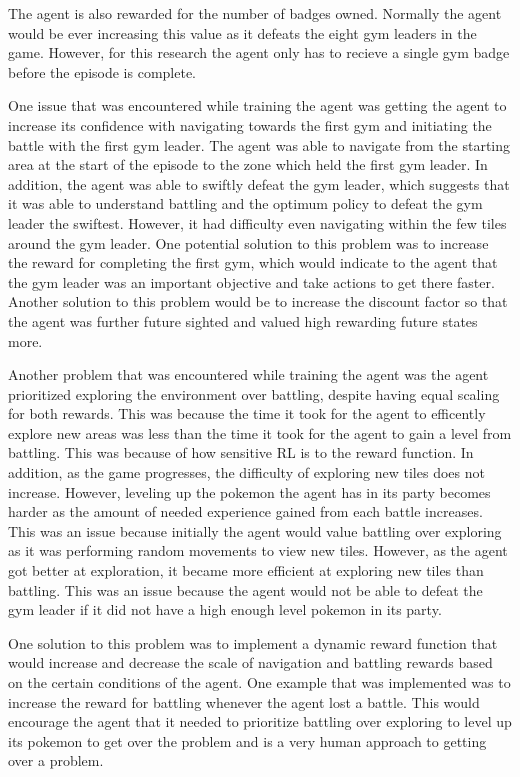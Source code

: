 The agent is also rewarded for the number of badges owned. Normally the agent would be ever increasing this value as it defeats the eight gym leaders in the game. However, for this research the agent only has to recieve a single gym badge before the episode is complete.

One issue that was encountered while training the agent was getting the agent to increase its confidence with navigating towards the first gym and initiating the battle with the first gym leader. The agent was able to navigate from the starting area at the start of the episode to the zone which held the first gym leader. In addition, the agent was able to swiftly defeat the gym leader, which suggests that it was able to understand battling and the optimum policy to defeat the gym leader the swiftest. However, it had difficulty even navigating within the few tiles around the gym leader. One potential solution to this problem was to increase the reward for completing the first gym, which would indicate to the agent that the gym leader was an important objective and take actions to get there faster. Another solution to this problem would be to increase the discount factor so that the agent was further future sighted and valued high rewarding future states more. 

Another problem that was encountered while training the agent was the agent prioritized exploring the environment over battling, despite having equal scaling for both rewards. This was because the time it took for the agent to efficently explore new areas was less than the time it took for the agent to gain a level from battling. This was because of how sensitive RL is to the reward function. In addition, as the game progresses, the difficulty of exploring new tiles does not increase. However, leveling up the pokemon the agent has in its party becomes harder as the amount of needed experience gained from each battle increases. This was an issue because initially the agent would value battling over exploring as it was performing random movements to view new tiles. However, as the agent got better at exploration, it became more efficient at exploring new tiles than battling. This was an issue because the agent would not be able to defeat the gym leader if it did not have a high enough level pokemon in its party. 

One solution to this problem was to implement a dynamic reward function that would increase and decrease the scale of navigation and battling rewards based on the certain conditions of the agent. One example that was implemented was to increase the reward for battling whenever the agent lost a battle. This would encourage the agent that it needed to prioritize battling over exploring to level up its pokemon to get over the problem and is a very human approach to getting over a problem. 

